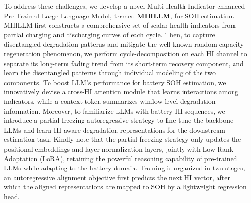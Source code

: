 \documentclass[preprint,12pt]{elsarticle}
\begin{document}
To address these challenges, we develop a novel Multi-Health-Indicator-enhanced Pre-Trained Large Language Model, termed \textbf{MHILLM}, for SOH estimation. MHILLM first constructs a comprehensive set of scalar health indicators from partial charging and discharging curves of each cycle. Then, to capture disentangled degradation patterns and mitigate the well-known random capacity regeneration phenomenon, we perform cycle-decomposition on each HI channel to separate its long-term fading trend from its short-term recovery component, and learn the disentangled patterns through individual modeling of the two components. 
To boost LLM's performance for battery SOH estimation, we innovatively devise a cross-HI attention module that learns interactions among indicators, while a context token summarizes window-level degradation information. 
Moreover, to familiarize LLMs with battery HI sequences, we introduce a partial-freezing autoregressive strategy to fine-tune the backbone LLMs and learn HI-aware degradation representations for the downstream estimation task. Kindly note that the partial-freezing strategy only updates the positional embeddings and layer normalization layers, jointly with Low-Rank Adaptation (LoRA), retaining the powerful reasoning capability of pre-trained LLMs while adapting to the battery domain. 
Training is organized in two stages, an autoregressive alignment objective first predicts the next HI vector, after which the aligned representations are mapped to SOH by a lightweight regression head.
\end{document}
